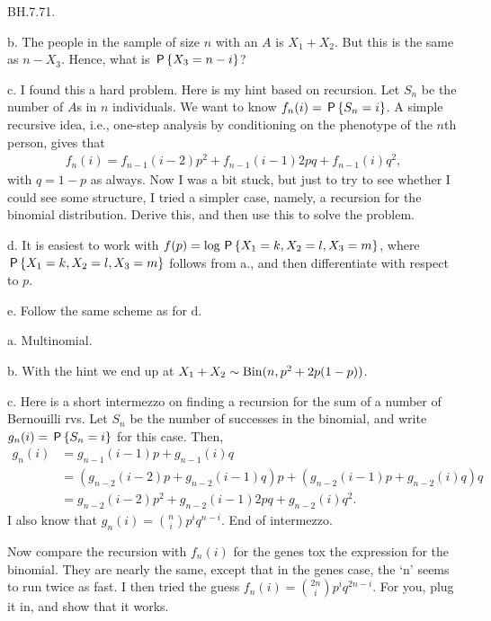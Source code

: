 \setcounter{theorem}{70}
\begin{exercise}
BH.7.71.

\begin{hint}

b. The people in the sample of size $n$ with an $A$ is $X_1+X_2$. But this is the same as $n-X_3$. Hence, what is $\P{X_3=n-i}$?


c. I found this a hard problem.
Here is my hint based on recursion.
Let $S_n$ be the number of $A$s in $n$ individuals.
We want to know $f_n(i) = \P{S_n=i}$.
A simple recursive idea, i.e., one-step analysis by conditioning on the phenotype of the $n$th person, gives that
\begin{align*}
f_n(i)=f_{n-1}(i-2) p^2 + f_{n-1}(i-1) 2p q + f_{n-1}(i)q^2,
\end{align*}
with $q=1-p$ as always. Now I was a bit stuck, but just to try to see whether I could see some structure, I tried a simpler case, namely, a recursion for the binomial distribution. Derive this, and then use this to solve the problem.


d. It is easiest to work with $f(p) = \log \P{X_1=k, X_2=l, X_3 = m}$, where $\P{X_1=k, X_2=l, X_3 = m}$ follows from a., and then differentiate with respect to $p$.

e. Follow the same scheme as for d.
\end{hint}

\begin{solution}
a. Multinomial.

b. With the hint we end up at $X_1+X_2\sim \Bin{n, p^2+2p(1-p)}$.

c. Here is a short intermezzo on finding a recursion for the sum of a number of Bernouilli rvs.  Let $S_n$ be the number of successes in the binomial, and write $g_n(i) = \P{S_n=i}$ for this case.
Then,
\begin{align*}
g_n(i)&= g_{n-1}(i-1)p +  g_{n-1}(i)q \\
&= (g_{n-2}(i-2)p + g_{n-2}(i-1)q)p + (g_{n-2}(i-1)p+g_{n-2}(i)q)q \\
&= g_{n-2}(i-2)p^2 + g_{n-2}(i-1)2p q + g_{n-2}(i)q^{2}.
\end{align*}
I also know that $g_n(i) = {n \choose i} p^iq^{n-i}$.
End of intermezzo.

Now compare the recursion with $f_n(i)$ for the genes tox the expression for the binomial.
They are nearly the same, except that in the genes case, the `n' seems to run twice as fast.
I then tried the guess $f_n(i) = {2n \choose i} p^i q^{2n-i}$.
For you, plug it in, and show that it works.


\end{solution}
\end{exercise}

